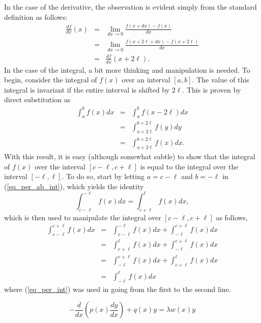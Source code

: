 \begin{textblock*}{90mm}
In the case of the derivative, the observation is evident simply from 
the standard definition as follows:
\begin{eqnarray*}
  \frac{d f}{d x}(x) & = & \lim_{dx \rightarrow 0} \frac{ f(x+dx)-f(x)}{dx}\\
                     & = & \lim_{dx \rightarrow 0} \frac{ f(x + 2\ell + dx) - f(x + 2\ell) }{dx} \\
                     & = & \frac{d f}{d x}(x + 2\ell).
\end{eqnarray*}
In the case of the integral, a bit more thinking and manipulation is needed.
To begin, consider the integral of $f(x)$ over an interval $[a,b]$.  The value of this integral 
is invariant if the entire interval is shifted by $2 \ell$.  This is proven by direct substitution
as 
\begin{eqnarray}\label{eq_per_ab_int}
  \int_{a}^{b} f(x) dx & = & \int_{a}      ^{b}       f(x - 2\ell) dx            \\
                       & = & \int_{a+2\ell}^{b+2\ell} f(y)         dy  \nonumber \\
                       & = & \int_{a+2\ell}^{b+2\ell} f(x)         dx. \nonumber
\end{eqnarray}
With this result, it is easy (although somewhat subtle) to show that the integral
of $f(x)$ over the interval $[c-\ell,c+\ell]$ is equal to the integral over 
the interval $[-\ell,\ell]$.  To do so, start by letting $a = c - \ell$ and $b = -\ell$
in (\ref{eq_per_ab_int}), which yields the identity 
\begin{equation}\label{eq_per_int}
  \int_{c-\ell}^{-\ell} f(x) dx  =  \int_{c+\ell}^{\ell} f(x) dx,
\end{equation}
which is then used to manipulate the integral over $[c-\ell,c+\ell]$ as follows,
\begin{eqnarray} 
  \int_{c-\ell}^{c+\ell} f(x) dx  & = &  \int_{c-\ell}^{-\ell} f(x) dx + \int_{-\ell}^{c+\ell} f(x) dx \\
                                  & = &  \int_{c+\ell}^{\ell}  f(x) dx + \int_{-\ell}^{c+\ell} f(x) dx \nonumber \\
                                  & = &  \int_{-\ell}^{c+\ell} f(x) dx + \int_{c+\ell}^{\ell}  f(x) dx \nonumber \\
                                  & = &  \int_{-\ell}^{\ell}   f(x) dx                                 \nonumber
\end{eqnarray}
where (\ref{eq_per_int}) was used in going from the first to the second line.

\[
  -\frac{d}{d x}\left( p(x) \frac{d y}{d x} \right) + q(x) y = \lambda w(x) y
\]
\end{textblock*}

